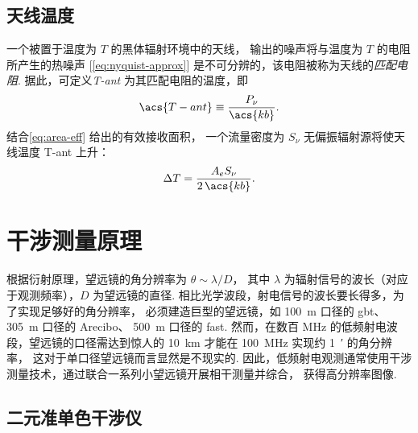 \subsection{天线温度}
\label{sec:t-ant}

一个被置于温度为 $T$ 的黑体辐射环境中的天线，
输出的噪声将与温度为 $T$ 的电阻所产生的热噪声 [\autoref{eq:nyquist-approx}]
是不可分辨的，该电阻被称为天线的\emph{匹配电阻}.
据此，可定义\emph{\ac{T-ant}} 为其匹配电阻的温度，即
\begin{equation}
  \label{eq:t-ant}
  \acs{T-ant} \equiv \frac{P_{\nu}}{\acs{kb}} .
\end{equation}
结合\autoref{eq:area-eff} 给出的有效接收面积，
一个流量密度为 $S_{\nu}$ 无偏振辐射源将使天线温度 \acs{T-ant} 上升：
\begin{equation}
  \label{eq:dt-source}
  \Delta T = \frac{A_e S_{\nu}}{2\,\acs{kb}} .
\end{equation}


\section{干涉测量原理}
\label{sec:interferometry}

根据衍射原理，望远镜的角分辨率为 $\theta \sim \lambda / D$，
其中 $\lambda$ 为辐射信号的波长（对应于观测频率），$D$ 为望远镜的直径.
相比光学波段，射电信号的波长要长得多，为了实现足够好的角分辨率，
必须建造巨型的望远镜，如 \SI{100}{\meter} 口径的 \ac{gbt}、
\SI{305}{\meter} 口径的 Arecibo、
\SI{500}{\meter} 口径的 \ac{fast}.
然而，在数百 \si{\MHz} 的低频射电波段，望远镜的口径需达到惊人的 \SI{10}{\km}
才能在 \SI{100}{\MHz} 实现约 \SI{1}{\arcminute} 的角分辨率，
这对于单口径望远镜而言显然是不现实的.
因此，低频射电观测通常使用干涉测量技术，通过联合一系列小望远镜开展相干测量并综合，
获得高分辨率图像.

\subsection{二元准单色干涉仪}

